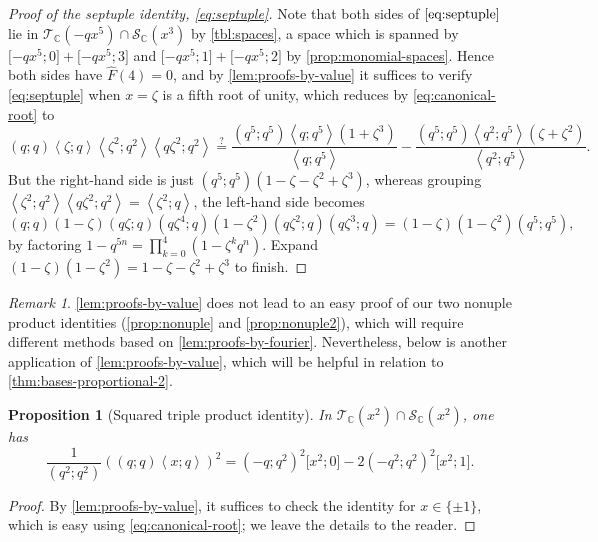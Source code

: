 \documentclass[reqno,11pt]{amsart}
\newtheorem{proposition}[theorem]{Proposition}
\theoremstyle{definition}
\theoremstyle{remark}
\newtheorem*{remark}{Remark}
\numberwithin{equation}{section}
\newcommand{\C}{\mathbb{C}}
\newcommand{\mT}{\mathcal{T}}
\newcommand{\mS}{\mathcal{S}}
\newcommand{\la}{\left\langle}
\newcommand{\ra}{\right\rangle}
\newcommand{\vect}[2]{\big[{#1};{#2}\big]}
\renewcommand{\hat}{\widehat}
\begin{document}
\begin{proof}[Proof of the septuple identity, \cref{eq:septuple}]
Note that both sides of $\cref{eq:septuple}$ lie in $\mT_\C\left(-qx^5\right) \cap \mS_\C\left(x^3\right)$ by \cref{tbl:spaces}, a space which is spanned by $\vect{-qx^5}{0} + \vect{-qx^5}{3}$ and $\vect{-qx^5}{1} + \vect{-qx^5}{2}$ by \cref{prop:monomial-spaces}. Hence both sides have $\hat{F}(4) = 0$, and by \cref{lem:proofs-by-value} it suffices to verify \cref{eq:septuple} when $x = \zeta$ is a fifth root of unity, which reduces by \cref{eq:canonical-root} to
\[
    (q; q) \la \zeta; q \ra \la \zeta^2; q^2 \ra \la q\zeta^2; q^2 \ra 
    \stackrel{?}{=}
    \frac{\left(q^5; q^5\right)\la q; q^5 \ra \left(1 + \zeta^3\right)}{\la q; q^5 \ra} - \frac{\left(q^5; q^5\right)\la q^2; q^5\ra \left(\zeta + \zeta^2\right)}{\la q^2; q^5 \ra}.
\]
But the right-hand side is just $\left(q^5; q^5\right)\left(1 - \zeta - \zeta^2 + \zeta^3\right)$, whereas grouping $\la \zeta^2; q^2 \ra \la q\zeta^2; q^2 \ra = \la \zeta^2; q \ra$, the left-hand side becomes
\[
    (q; q) (1 - \zeta) (q \zeta; q) \left(q\zeta^4; q\right) \left(1 - \zeta^2\right) \left(q \zeta^2; q\right) \left(q\zeta^3; q\right)
    =
    (1 - \zeta)\left(1 - \zeta^2\right) \left(q^5; q^5\right),
\]
by factoring $1 - q^{5n} = \prod_{k=0}^4 \left(1 - \zeta^k q^n\right)$. Expand $\left( 1- \zeta\right)\left(1 - \zeta^2\right) = 1 - \zeta - \zeta^2 + \zeta^3$ to finish.
\end{proof}


\begin{remark}
\cref{lem:proofs-by-value} does not lead to an easy proof of our two nonuple product identities (\cref{prop:nonuple} and \cref{prop:nonuple2}), which will require different methods based on \cref{lem:proofs-by-fourier}. Nevertheless, below is another application of \cref{lem:proofs-by-value}, which will be helpful in relation to \cref{thm:bases-proportional-2}.
\end{remark}

\begin{proposition}[Squared triple product identity]
\label{prop:squared-triple}
In $\mT_\C\left(x^2\right) \cap \mS_\C\left(x^2\right)$, one has
\[
    \frac{1}{\left(q^2; q^2\right)}\left((q; q)\la x; q \ra\right)^2 = \left(-q; q^2\right)^2 \vect{x^2}{0} - 2\left(-q^2; q^2\right)^2\vect{x^2}{1}.
\]

\end{proposition}
\begin{proof}
By \cref{lem:proofs-by-value}, it suffices to check the identity for $x \in \{\pm 1\}$, which is easy using \cref{eq:canonical-root}; we leave the details to the reader.
\end{proof}
\end{document}
